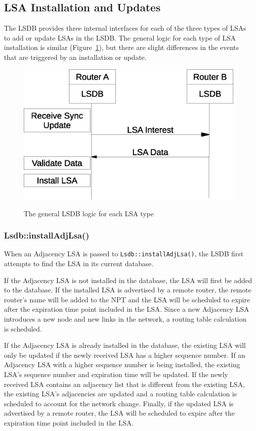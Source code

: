 \subsection{LSA Installation and Updates}

The LSDB provides three internal interfaces for each of the three types of LSAs to add or update LSAs in the LSDB.
The general logic for each type of LSA installation is similar (Figure~\ref{fig:generic-lsdb-flow}), but there are slight differences in the events that are triggered by an installation or update.

\begin{figure}[h]
\center
\includegraphics[width=0.5\linewidth]{figures/generic-lsdb-flow}
\label{fig:generic-lsdb-flow}
\caption{The general LSDB logic for each LSA type}
\end{figure}

\subsubsection{Lsdb::installAdjLsa()}

When an Adjacency LSA is passed to \texttt{Lsdb::installAdjLsa()}, the LSDB first attempts to find the LSA in its current database.

If the Adjacency LSA is not installed in the database, the LSA will first be added to the database.
If the installed LSA is advertised by a remote router, the remote router's name will be added to the NPT and the LSA will be scheduled to expire after the expiration time point included in the LSA.
Since a new Adjacency LSA introduces a new node and new links in the network, a routing table calculation is scheduled.

If the Adjacency LSA is already installed in the database, the existing LSA will only be updated if the newly received LSA has a higher sequence number.
If an Adjacency LSA with a higher sequence number is being installed, the existing LSA's sequence number and expiration time will be updated.
If the newly received LSA contains an adjacency list that is different from the existing LSA, the existing LSA's adjacencies are updated and a routing table calculation is scheduled to account for the network change.
Finally, if the updated LSA is advertised by a remote router, the LSA will be scheduled to expire after the expiration time point included in the LSA.

